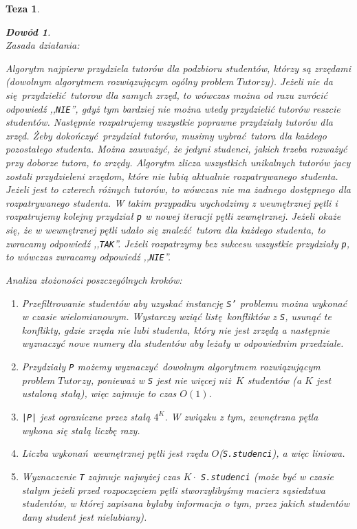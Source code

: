 \documentclass[12pt]{article}
\newtheorem*{theorem*}{Teza}
\newtheorem*{proof*}{Dowód}
\begin{document}
\begin{titlepage}
\begin{theorem*}
\begin{proof*}
$ $\\
Zasada działania:

Algorytm najpierw przydziela tutorów dla podzbioru 
studentów, którzy są  zrzędami (dowolnym algorytmem rozwiązującym ogólny 
problem $Tutorzy$). Jeżeli nie da się przydzielić tutorow 
dla samych zrzęd, to wówczas można od razu 
zwrócić odpowiedź ,,\texttt{NIE}'', gdyż tym bardziej nie można wtedy 
przydzielić tutorów reszcie studentów. Następnie rozpatrujemy wszystkie 
poprawne przydziały tutorów dla zrzęd. Żeby dokończyć przydział tutorów, musimy 
wybrać tutora dla każdego pozostałego studenta. Można zauważyć, że jedyni 
studenci, jakich trzeba rozważyć przy doborze tutora, to zrzędy. Algorytm 
zlicza wszystkich unikalnych tutorów jacy zostali przydzieleni zrzędom, które 
nie lubią aktualnie rozpatrywanego studenta. Jeżeli jest to czterech różnych 
tutorów, to wówczas nie ma żadnego dostępnego dla rozpatrywanego studenta. W 
takim przypadku wychodzimy z wewnętrznej pętli i rozpatrujemy kolejny przydział 
\texttt{p} w nowej iteracji pętli zewnętrznej. Jeżeli okaże się, że w 
wewnętrznej pętli udało się znaleźć tutora dla każdego studenta, to zwracamy 
odpowiedź ,,\texttt{TAK}''. Jeżeli rozpatrzymy bez sukcesu wszystkie przydziały 
\texttt{p}, to wówczas zwracamy odpowiedź ,,\texttt{NIE}''.

$ $\\
$ $\\
$ $\\
$ $\\
Analiza złożoności poszczególnych kroków:

\begin{enumerate}
    \item Przefiltrowanie studentów aby uzyskać instancję \texttt{S'} problemu 
    można wykonać w czasie wielomianowym. Wystarczy wziąć listę konfliktów z 
    \texttt{S}, usunąć te konflikty, gdzie zrzęda nie lubi studenta, który nie 
    jest zrzędą a następnie wyznaczyć nowe numery dla studentów aby leżały w 
    odpowiednim przedziale.
    \item Przydziały \texttt{P} możemy wyznaczyć dowolnym algorytmem 
    rozwiązującym problem $Tutorzy$, ponieważ w \texttt{S} jest nie więcej 
    niż $K$ studentów (a $K$ jest ustaloną stałą), więc zajmuje to czas $O(1)$.
    \item \texttt{|P|} jest ograniczne przez stałą $4^K$. W związku z tym, 
    zewnętrzna pętla wykona się stałą liczbę razy.
    \item Liczba wykonań wewnętrznej pętli jest rzędu $O$(\texttt{S.studenci}),
    a więc liniowa.
    \item Wyznaczenie \texttt{T} zajmuje najwyżej czas $K\cdot$ \texttt
    {S.studenci} (może być w czasie stałym jeżeli przed rozpoczęciem pętli 
    stworzylibyśmy macierz sąsiedztwa studentów, w której zapisana byłaby 
    informacja o tym, przez jakich studentów dany student jest nielubiany).
\end{enumerate}


\end{proof*}
\end{theorem*}
\end{titlepage}
\end{document}

